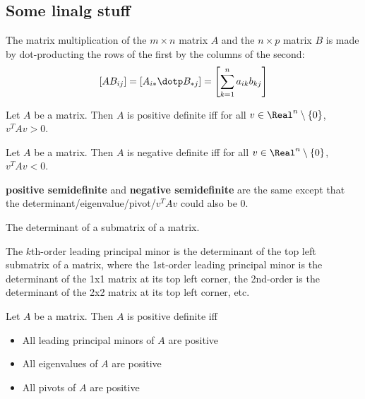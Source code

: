 \subsection{Some linalg stuff}

\begin{definition}
  The matrix multiplication of  the $m \times n$ matrix $A$ and the $n \times p$ matrix $B$ is made by dot-producting the rows of the first by the columns of the second:
  \[
    \left[AB_{ij}\right] = \left[A_{i*} \dotp B_{*j}\right] = \left[\sum_{k=1}^n a_{ik} b_{kj} \right]
  \]
\end{definition}

\begin{definition}
  Let $A$ be a matrix. Then $A$ is positive definite iff for all $v \in \Real^n \setminus \{0\}$, $v^T A v > 0$.
\end{definition}

\begin{definition}
  Let $A$ be a matrix. Then $A$ is negative definite iff for all $v \in \Real^n \setminus \{0\}$, $v^T A v < 0$.
\end{definition}

\textbf{positive semidefinite} and \textbf{negative semidefinite} are the same except that the determinant/eigenvalue/pivot/$v^T A v$ could also be 0.

\begin{definition}
  The determinant of a submatrix of a matrix.
\end{definition}

\begin{definition}
  The $k$th-order leading principal minor is the determinant of the top left submatrix of a matrix, where the 1st-order leading principal minor is the determinant of the 1x1 matrix at its top left corner, the 2nd-order is the determinant of the 2x2 matrix at its top left corner, etc.
\end{definition}

\begin{theorem}
  Let $A$ be a matrix. Then $A$ is positive definite iff
  \begin{itemize}
    \item All leading principal minors of $A$ are positive
    \item All eigenvalues of $A$ are positive
    \item All pivots of $A$ are positive
  \end{itemize}
\end{theorem}

